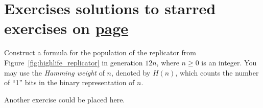 \section*{Exercises \hfill \normalfont\textsf{\small solutions to starred exercises on \hyperlink{solutions_0e0p}{page \pageref{solutions_0e0p}}}}
\label{sec:solutions_0e0p}
\vspace*{-0.4cm}\hrulefill\vspace*{-0.3cm}\footnotesize\begin{multicols}{2}\vspace*{-0.4cm}\raggedcolumns{}
	\setlength{\parskip}{0pt}
	
	
	\begin{problem}\label{exer:0e0p_hamming_weight} 
		Construct a formula for the population of the replicator from Figure~\ref{fig:highlife_replicator} in generation $12n$, where $n \geq 0$ is an integer. You may use the \emph{Hamming weight} of $n$, denoted by $H(n)$, which counts the number of ``1'' bits in the binary representation of $n$.
	\end{problem}
	
	
	\mfilbreak
	
	
	\begin{problem}\label{exer:0e0p_ex2}
		Another exercise could be placed here.
	\end{problem}
	
	
\end{multicols}
\normalsize\vspace*{0.01cm}
